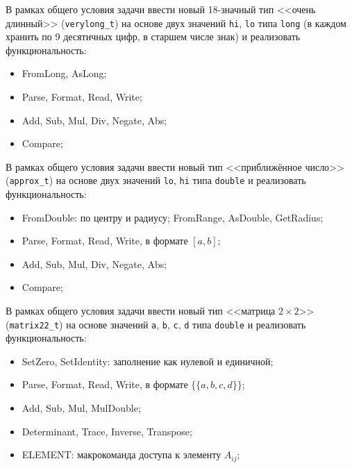 
\begin{zztask}
В рамках общего условия задачи ввести новый 18-значный тип <<очень длинный>>
(\texttt{verylong\_t}) на основе двух значений \texttt{hi}, \texttt{lo} типа
\texttt{long} (в каждом хранить по 9 десятичных цифр, в старшем числе знак) и
реализовать функциональность:
%
\begin{itemize}
\item FromLong, AsLong;
\item Parse, Format, Read, Write;
\item Add, Sub, Mul, Div, Negate, Abs;
\item Compare;
\end{itemize}
\end{zztask}


\begin{zztask}
В рамках общего условия задачи ввести новый тип <<приближённое число>>
(\texttt{approx\_t}) на основе двух значений \texttt{lo}, \texttt{hi} типа
\texttt{double} и реализовать функциональность:
%
\begin{itemize}
\item FromDouble: по центру и радиусу; FromRange, AsDouble, GetRadius;
\item Parse, Format, Read, Write, в формате $[a, b]$;
\item Add, Sub, Mul, Div, Negate, Abs;
\item Compare;
\end{itemize}
\end{zztask}


\begin{zztask}
В рамках общего условия задачи ввести новый тип <<матрица $2\times 2$>>
(\texttt{matrix22\_t}) на основе значений \texttt{a}, \texttt{b}, \texttt{c},
\texttt{d} типа \texttt{double} и реализовать функциональность:
%
\begin{itemize}
\item SetZero, SetIdentity: заполнение как нулевой и единичной;
\item Parse, Format, Read, Write, в формате $\{\{a,b,c,d\}\}$;
\item Add, Sub, Mul, MulDouble;
\item Determinant, Trace, Inverse, Transpose;
\item ELEMENT: макрокоманда доступа к элементу $A_{ij}$;
\end{itemize}
\end{zztask}

